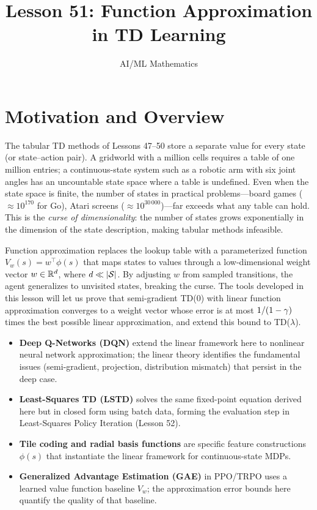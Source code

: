 \documentclass[11pt,a4paper]{article}
\title{Lesson 51: Function Approximation in TD Learning}
\author{AI/ML Mathematics}
\date{}
\begin{document}
\maketitle
\tableofcontents
\newpage

\section{Motivation and Overview}
\label{sec:motivation}

The tabular TD methods of Lessons 47--50 store a separate value for every
state (or state--action pair). A gridworld with a million cells requires a
table of one million entries; a continuous-state system such as a robotic
arm with six joint angles has an uncountable state space where a table is
undefined. Even when the state space is finite, the number of states in
practical problems---board games ($\approx 10^{170}$ for Go), Atari
screens ($\approx 10^{30\,000}$)---far exceeds what any table can hold.
This is the \emph{curse of dimensionality}: the number of states grows
exponentially in the dimension of the state description, making tabular
methods infeasible.

Function approximation replaces the lookup table with a parameterized
function $V_w(s) = w^\top \phi(s)$ that maps states to values through a
low-dimensional weight vector $w \in \mathbb{R}^d$, where $d \ll |\mathcal{S}|$.
By adjusting $w$ from sampled transitions, the agent generalizes to
unvisited states, breaking the curse. The tools developed in this lesson
will let us prove that semi-gradient TD(0) with linear function
approximation converges to a weight vector whose error is at most
$1/(1-\gamma)$ times the best possible linear approximation, and
extend this bound to TD($\lambda$).

\begin{rlconnection}[title={Where Linear Function Approximation Appears}]
\begin{itemize}[nosep]
  \item \textbf{Deep Q-Networks (DQN)} extend the linear framework here
    to nonlinear neural network approximation; the linear theory
    identifies the fundamental issues (semi-gradient, projection,
    distribution mismatch) that persist in the deep case.
  \item \textbf{Least-Squares TD (LSTD)} solves the same fixed-point
    equation derived here but in closed form using batch data, forming
    the evaluation step in Least-Squares Policy Iteration (Lesson 52).
  \item \textbf{Tile coding and radial basis functions} are specific
    feature constructions $\phi(s)$ that instantiate the linear
    framework for continuous-state MDPs.
  \item \textbf{Generalized Advantage Estimation (GAE)} in PPO/TRPO
    uses a learned value function baseline $V_w$; the approximation
    error bounds here quantify the quality of that baseline.
\end{itemize}
\end{rlconnection}
\end{document}
